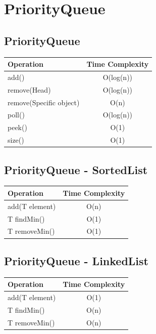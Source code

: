 \documentclass{article}
\begin{document}
\section{PriorityQueue}

\subsection{PriorityQueue}
\begin{table}[!ht]
  \centering
  \begin{tabular}{|l|c|}
  \hline
  \textbf{Operation} & \textbf{Time Complexity} \\
  \hline
  add() & O(log(n))\\
  \hline
  remove(Head) & O(log(n))\\
  \hline
  remove(Specific object) & O(n)\\
  \hline
  poll() & O(log(n))\\
  \hline  
  peek() & O(1)\\
  \hline  
  size() & O(1)\\
  \hline  
  \end{tabular}
  \end{table}

\subsection{PriorityQueue - SortedList}
\begin{table}[!ht]
\centering
\begin{tabular}{|l|c|}
\hline
\textbf{Operation} & \textbf{Time Complexity} \\
\hline
add(T element) & O(n) \\
\hline
T findMin() & O(1) \\
\hline
T removeMin() & O(1) \\
\hline
\end{tabular}
\end{table}
\subsection{PriorityQueue - LinkedList}
\begin{table}[!ht]
\centering
\begin{tabular}{|l|c|}
\hline
\textbf{Operation} & \textbf{Time Complexity} \\
\hline
add(T element) & O(1) \\
\hline
T findMin() & O(n) \\
\hline
T removeMin() & O(n) \\
\hline
\end{tabular}
\end{table}
\end{document}
